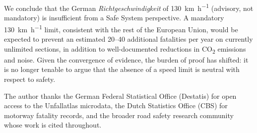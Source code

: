 \documentclass[aps,prl,twocolumn,superscriptaddress,longbibliography]{revtex4-2}
\begin{document}
We conclude that the German \textit{Richtgeschwindigkeit} of \SI{130}{\kilo\metre\per\hour}
(advisory, not mandatory) is insufficient from a Safe System perspective.
A mandatory \SI{130}{\kilo\metre\per\hour} limit, consistent with the rest of the
European Union, would be expected to prevent an estimated 20--40 additional
fatalities per year on currently unlimited sections, in addition to well-documented
reductions in CO\textsubscript{2} emissions and noise.
Given the convergence of evidence, the burden of proof has shifted: it is no longer
tenable to argue that the absence of a speed limit is neutral with respect to
safety.

\begin{acknowledgments}
The author thanks the German Federal Statistical Office (Destatis) for open access
to the Unfallatlas microdata, the Dutch Statistics Office (CBS) for motorway
fatality records, and the broader road safety research community whose work is
cited throughout.
\end{acknowledgments}



\end{document}
